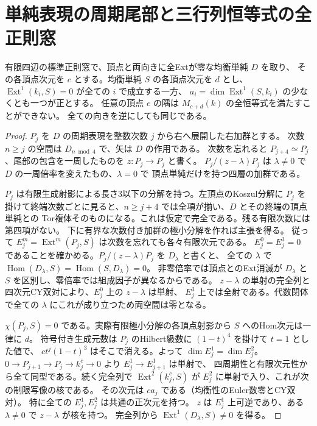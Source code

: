 \section{単純表現の周期尾部と三行列恒等式の全正則窓}
\label{sec:periodic-tail-vertex-bridges}
\begin{lemma}\label{lem:periodic-tail-vertex-bridges}
有限四辺の標準正則窓で、頂点と両向きに全Extが零な均衡単純 $D$ を取り、
その各頂点次元を $c$ とする。均衡単純 $S$ の各頂点次元を $d$ とし、
$\operatorname{Ext}^1(k_i,S)=0$ が全ての $i$ で成立する一方、
$a_i=\dim\operatorname{Ext}^1(S,k_i)$ の少なくとも一つが正とする。
任意の頂点 $e$ の隅は $M_{c+d}(k)$ の全恒等式を満たすことができない。
全ての向きを逆にしても同じである。
\end{lemma}
\begin{proof}
$P_j$ を $D$ の周期表現を整数次数 $j$ から右へ展開した右加群とする。
次数 $n\ge j$ の空間は $D_{n\bmod4}$ で、矢は $D$ の作用である。
次数を忘れると $P_{j+4}\simeq P_j$、尾部の包含を一周したものを $z:P_j\to P_j$ と書く。
$P_j/(z-\lambda)P_j$ は $\lambda\ne0$ で $D$ の一周倍率を変えたもの、$\lambda=0$ で
頂点単純だけを持つ四層の加群である。

$P_j$ は有限生成射影による長さ3以下の分解を持つ。左頂点のKoszul分解に $P_j$ を
掛けて終端次数ごとに見ると、$n\ge j+4$ では全項が揃い、$D$ とその終端の頂点単純との
Tor複体そのものになる。これは仮定で完全である。残る有限次数には第四項がない。
下に有界な次数付き加群の極小分解を作れば主張を得る。
従って $E_j^m=\operatorname{Ext}^m(P_j,S)$ は次数を忘れても各々有限次元である。
$E_j^0=E_j^3=0$ であることを確かめる。$P_j/(z-\lambda)P_j$ を $D_\lambda$ と書くと、
全ての $\lambda$ で $\operatorname{Hom}(D_\lambda,S)=\operatorname{Hom}(S,D_\lambda)=0$。
非零倍率では頂点とのExt消滅が $D_\lambda$ と $S$ を区別し、零倍率では組成因子が異なるからである。
$z-\lambda$ の単射の完全列と四次元CY双対により、$E_j^0$ 上の $z-\lambda$ は単射、
$E_j^3$ 上では全射である。代数閉体で全ての $\lambda$ にこれが成り立つため両空間は零となる。

$\chi(P_j,S)=0$ である。実際有限極小分解の各頂点射影から $S$ へのHom次元は一律に $d$。
符号付き生成元数は $P_j$ のHilbert級数に $(1-t)^4$ を掛けて $t=1$ とした値で、
$ct^j(1-t)^3$ はそこで消える。よって $\dim E_j^1=\dim E_j^2$。
$0\to P_{j+1}\to P_j\to k_j^c\to0$ より $E_j^1\to E_{j+1}^1$ は単射で、
四周期性と有限次元性から全て同型である。続く完全列で
$\operatorname{Ext}^2(k_j^c,S)$ が $E_j^2$ に単射で入り、これが次の制限写像の核である。
その次元は $c a_j$ である（均衡性のEuler数零とCY双対）。
特に全ての $E_j^1,E_j^2$ は共通の正次元を持つ。
$z$ は $E_j^1$ 上可逆であり、ある $\lambda\ne0$ で $z-\lambda$ が核を持つ。
完全列から $\operatorname{Ext}^1(D_\lambda,S)\ne0$ を得る。


\end{proof}

